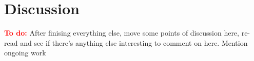 \documentclass{imsart}
\newcommand{\minimize}{\mathop{\mathrm{minimize}}}
\newcommand{\todo}{\textcolor{red}{\textbf{To do: }}}
\newcommand{\real}{\mathbb{R}}
\begin{document}
\section{Discussion}
\label{sec:discuss}

\todo After finising everything else, move some points of discussion
here, re-read and see if there's anything else interesting to comment
on here. Mention ongoing work



%
%
%
%
\end{document}

